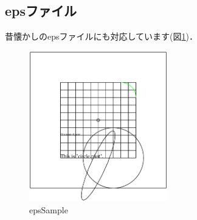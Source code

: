 \documentclass[twocolumn,10pt]{jarticle}
\begin{document}
\subsection{epsファイル}
昔懐かしのepsファイルにも対応しています(図\ref{fig:epsSample})．
\begin{figure}[htbp]
	\centering
	\includegraphics[width=6cm]{./fig/circle.eps}
	\caption{epsSample\cite{EPSFiles}}
	\label{fig:epsSample}
\end{figure}



\end{document}
